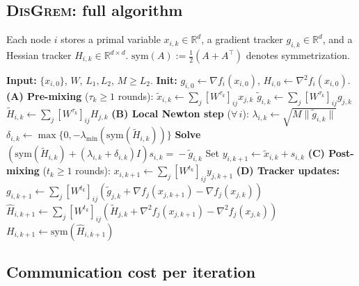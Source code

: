 \documentclass[10pt,twocolumn,letterpaper]{article}
\theoremstyle{compact}
\theoremstyle{compactremark}
\newcommand{\R}{\mathbb{R}}
\begin{document}
	\subsection{\textsc{DisGrem}: full algorithm}\label{ssec:disgrem}
	
	Each node $i$ stores a primal variable $x_{i,k}\in\R^d$, a gradient tracker $g_{i,k}\in\R^d$,
	and a Hessian tracker $H_{i,k}\in\R^{d\times d}$.
	$\mathrm{sym}(A):=\tfrac12(A+A^\top)$ denotes symmetrization.
	
	\begin{algorithm}[t]
\caption{\textsc{DisGrem}}
\label{alg:disgrem}
\small
\begin{algorithmic}[1]
\State \textbf{Input:} $\{x_{i,0}\}$, $W$, $L_1,L_2$, $M\ge L_2$.
\State \textbf{Init:} $g_{i,0}\!\gets\!\nabla f_i(x_{i,0})$, $H_{i,0}\!\gets\!\nabla^2 f_i(x_{i,0})$.
\State \textbf{(A) Pre-mixing} ($\tau_k\!\ge\!1$ rounds):
\Statex\quad $\tilde x_{i,k}\!\gets\!\textstyle\sum_j [W^{\tau_k}]_{ij}x_{j,k}$
\Statex\quad $\tilde g_{i,k}\!\gets\!\textstyle\sum_j [W^{\tau_k}]_{ij}g_{j,k}$
\Statex\quad $\tilde H_{i,k}\!\gets\!\textstyle\sum_j [W^{\tau_k}]_{ij}H_{j,k}$
\State \textbf{(B) Local Newton step} ($\forall\,i$):
\Statex\quad $\lambda_{i,k}\!\gets\!\sqrt{M\|\tilde g_{i,k}\|}$
\Statex\quad $\delta_{i,k}\!\gets\!\max\{0,-\lambda_{\min}(\mathrm{sym}(\tilde H_{i,k}))\}$
\Statex\quad \textbf{Solve} $(\mathrm{sym}(\tilde H_{i,k})\!+\!(\lambda_{i,k}\!+\!\delta_{i,k})I)s_{i,k}\!=\!-\tilde g_{i,k}$
\Statex\quad Set $y_{i,k+1}\!\gets\!\tilde x_{i,k}+s_{i,k}$
\State \textbf{(C) Post-mixing} ($t_k\!\ge\!1$ rounds):
\Statex\quad $x_{i,k+1}\!\gets\!\textstyle\sum_j [W^{t_k}]_{ij}y_{j,k+1}$
\State \textbf{(D) Tracker updates:}
\Statex\quad $g_{i,k+1}\!\gets\!\textstyle\sum_j [W^{t_k}]_{ij}(\tilde g_{j,k}+\nabla f_j(x_{j,k+1})\!-\!\nabla f_j(x_{j,k}))$
\Statex\quad $\widehat H_{i,k+1}\!\gets\!\textstyle\sum_j [W^{t_k}]_{ij}(\tilde H_{j,k}+\nabla^2 f_j(x_{j,k+1})\!-\!\nabla^2 f_j(x_{j,k}))$
\Statex\quad $H_{i,k+1}\!\gets\!\mathrm{sym}(\widehat H_{i,k+1})$
\EndFor
\end{algorithmic}
\end{algorithm}
	
\subsection{Communication cost per iteration}\label{ssec:comm}
\end{document}
